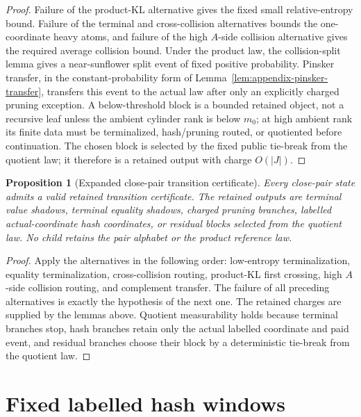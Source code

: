 \documentclass[11pt]{article}
\newtheorem{proposition}[theorem]{Proposition}
\theoremstyle{remark}
\begin{document}
\begin{proof}
Failure of the product-KL alternative gives the fixed small relative-entropy
bound.  Failure of the terminal and cross-collision alternatives bounds the
one-coordinate heavy atoms, and failure of the high $A$-side collision
alternative gives the required average collision bound.  Under the product law,
the collision-split lemma gives a near-sunflower split event of fixed positive
probability.  Pinsker transfer, in the constant-probability form of
Lemma~\ref{lem:appendix-pinsker-transfer}, transfers this event to the actual
law after only an explicitly charged pruning exception.  A below-threshold
block is a bounded retained object, not a recursive leaf unless the ambient
cylinder rank is below $m_0$; at high ambient rank its finite data must be
terminalized, hash/pruning routed, or quotiented before continuation.  The
chosen block is selected by the fixed public tie-break from the quotient law;
it therefore is a retained output with charge $O(|J|)$.
\end{proof}

\begin{proposition}[Expanded close-pair transition certificate]\label{prop:app-close-pair-certificate}
Every close-pair state admits a valid retained transition certificate.  The retained outputs are terminal value shadows, terminal equality shadows, charged pruning branches, labelled actual-coordinate hash coordinates, or residual blocks selected from the quotient law.  No child retains the pair alphabet or the product reference law.
\end{proposition}

\begin{proof}
Apply the alternatives in the following order: low-entropy terminalization, equality terminalization, cross-collision routing, product-KL first crossing, high $A$-side collision routing, and complement transfer.  The failure of all preceding alternatives is exactly the hypothesis of the next one.  The retained charges are supplied by the lemmas above.  Quotient measurability holds because terminal branches stop, hash branches retain only the actual labelled coordinate and paid event, and residual branches choose their block by a deterministic tie-break from the quotient law.
\end{proof}

\section{Fixed labelled hash windows}\label{app:hash}
\end{document}
